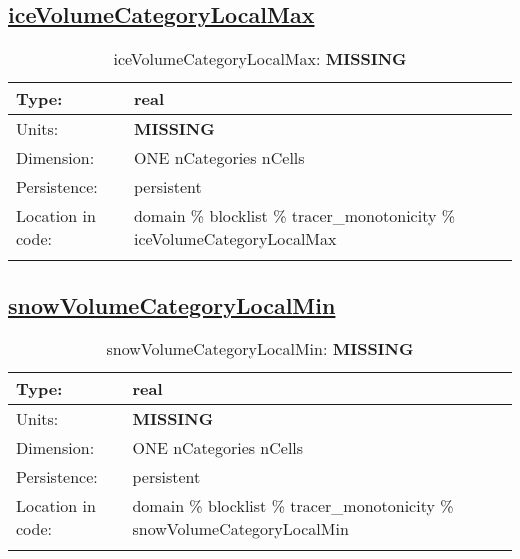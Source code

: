 \subsection[iceVolumeCategoryLocalMax]{\hyperref[sec:var_tab_tracer_monotonicity]{iceVolumeCategoryLocalMax}}
\label{subsec:var_sec_tracer_monotonicity_iceVolumeCategoryLocalMax}
\begin{center}
\begin{longtable}{| p{2.0in} | p{4.0in} |}
        \hline 
        Type: & real \\
        \hline 
        Units: & {\bf \color{red} MISSING} \\
        \hline 
        Dimension: & ONE nCategories nCells \\
        \hline 
        Persistence: & persistent \\
        \hline 
         Location in code: & domain \% blocklist \% tracer\_monotonicity \% iceVolumeCategoryLocalMax \\
         \hline 
    \caption{iceVolumeCategoryLocalMax: {\bf \color{red} MISSING}}
\end{longtable}
\end{center}
\subsection[snowVolumeCategoryLocalMin]{\hyperref[sec:var_tab_tracer_monotonicity]{snowVolumeCategoryLocalMin}}
\label{subsec:var_sec_tracer_monotonicity_snowVolumeCategoryLocalMin}
\begin{center}
\begin{longtable}{| p{2.0in} | p{4.0in} |}
        \hline 
        Type: & real \\
        \hline 
        Units: & {\bf \color{red} MISSING} \\
        \hline 
        Dimension: & ONE nCategories nCells \\
        \hline 
        Persistence: & persistent \\
        \hline 
         Location in code: & domain \% blocklist \% tracer\_monotonicity \% snowVolumeCategoryLocalMin \\
         \hline 
    \caption{snowVolumeCategoryLocalMin: {\bf \color{red} MISSING}}
\end{longtable}
\end{center}
